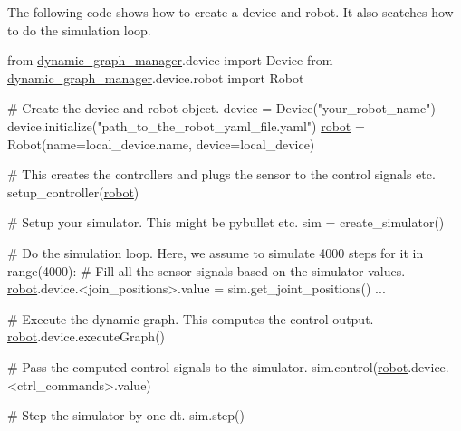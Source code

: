 The following code shows how to create a device and robot. It also scatches how to do the simulation loop. 
\begin{DoxyCode}
from \hyperlink{namespacedynamic__graph__manager}{dynamic\_graph\_manager}.device \textcolor{keyword}{import} Device
from \hyperlink{namespacedynamic__graph__manager}{dynamic\_graph\_manager}.device.robot \textcolor{keyword}{import} Robot

\textcolor{preprocessor}{# Create the device and robot object.}
device = Device(\textcolor{stringliteral}{"your\_robot\_name"})
device.initialize("path\_to\_the\_robot\_yaml\_file.yaml")
\hyperlink{namespacerobot}{robot} = Robot(name=local\_device.name, device=local\_device)

\textcolor{preprocessor}{# This creates the controllers and plugs the sensor to the control signals etc.}
setup\_controller(\hyperlink{namespacerobot}{robot})

\textcolor{preprocessor}{# Setup your simulator. This might be pybullet etc.}
sim = create\_simulator()

\textcolor{preprocessor}{# Do the simulation loop. Here, we assume to simulate 4000 steps}
\textcolor{keywordflow}{for} it in range(4000):
  # Fill all the sensor signals based on the simulator values.
  \hyperlink{namespacerobot}{robot}.device.<join\_positions>.value = sim.get\_joint\_positions()
  ...

  # Execute the dynamic graph. This computes the control output.
  \hyperlink{namespacerobot}{robot}.device.executeGraph()

  # Pass the computed control signals to the simulator.
  sim.control(\hyperlink{namespacerobot}{robot}.device.<ctrl\_commands>.value)

  # Step the simulator by one dt.
  sim.step()
\end{DoxyCode}
 